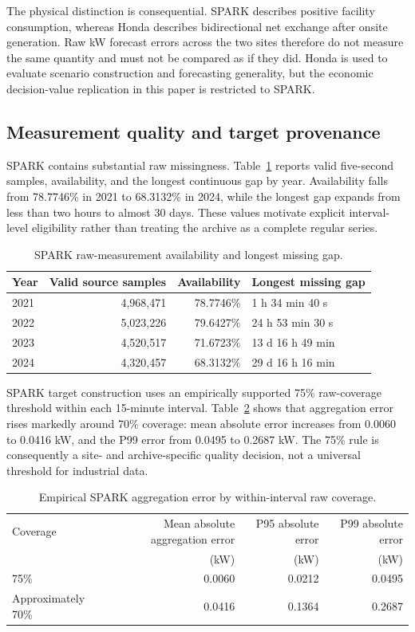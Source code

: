 \documentclass[10pt,twocolumn]{article}
\begin{document}
The physical distinction is consequential. SPARK describes positive facility
consumption, whereas Honda describes bidirectional net exchange after onsite
generation. Raw kW forecast errors across the two sites therefore do not measure
the same quantity and must not be compared as if they did. Honda is used to
evaluate scenario construction and forecasting generality, but the economic
decision-value replication in this paper is restricted to SPARK.

\subsection{Measurement quality and target provenance}

SPARK contains substantial raw missingness. Table~\ref{tab:spark-quality}
reports valid five-second samples, availability, and the longest continuous gap
by year. Availability falls from 78.7746\% in 2021 to 68.3132\% in 2024, while
the longest gap expands from less than two hours to almost 30 days. These values
motivate explicit interval-level eligibility rather than treating the archive
as a complete regular series.

\begin{table}[t]
\centering
\caption{SPARK raw-measurement availability and longest missing gap.}
\label{tab:spark-quality}
\small
\begin{tabular}{lrrl}
\toprule
Year & Valid source samples & Availability & Longest missing gap\\
\midrule
2021 & 4,968,471 & 78.7746\% & 1 h 34 min 40 s\\
2022 & 5,023,226 & 79.6427\% & 24 h 53 min 30 s\\
2023 & 4,520,517 & 71.6723\% & 13 d 16 h 49 min\\
2024 & 4,320,457 & 68.3132\% & 29 d 16 h 16 min\\
\bottomrule
\end{tabular}
\end{table}

SPARK target construction uses an empirically supported 75\% raw-coverage
threshold within each 15-minute interval. Table~\ref{tab:aggregation-error}
shows that aggregation error rises markedly around 70\% coverage: mean absolute
error increases from 0.0060 to 0.0416 kW, and the P99 error from 0.0495 to
0.2687 kW. The 75\% rule is consequently a site- and archive-specific quality
decision, not a universal threshold for industrial data.

\begin{table}[t]
\centering
\caption{Empirical SPARK aggregation error by within-interval raw coverage.}
\label{tab:aggregation-error}
\small
\begin{tabular}{lrrr}
\toprule
Coverage & Mean absolute aggregation error & P95 absolute error & P99 absolute error\\
 & (kW) & (kW) & (kW)\\
\midrule
75\% & 0.0060 & 0.0212 & 0.0495\\
Approximately 70\% & 0.0416 & 0.1364 & 0.2687\\
\bottomrule
\end{tabular}
\end{table}
\end{document}
